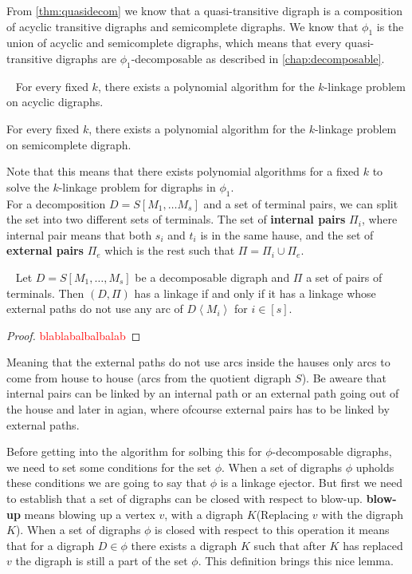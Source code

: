 From \autoref{thm:quasidecom} we know that a quasi-transitive digraph is a composition of acyclic transitive digraphs and semicomplete digraphs.
We know that $\phi_1$ is the union of acyclic and semicomplete digraphs, which means that every quasi-transitive digraphs are $\phi_1$-decomposable as described in \autoref{chap:decomposable}. 
\begin{thm}~\cite{bangJGT85}
    For every fixed $k$, there exists a polynomial algorithm for the $k$-linkage problem on acyclic digraphs.
\end{thm}
\begin{thm}
    For every fixed $k$, there exists a polynomial algorithm for the $k$-linkage problem on semicomplete digraph.
\end{thm}
Note that this means that there exists polynomial algorithms for a fixed $k$ to solve the $k$-linkage problem for digraphs in $\phi_1$.\\
For a decomposition $D=S[M_1,\dots M_s]$ and a set of terminal pairs, we can split the set into two different sets of terminals. 
The set of \textbf{internal pairs} $\Pi_i$, where internal pair means that both $s_i$ and $t_i$ is in the same hause, and the set of \textbf{external pairs} $\Pi_e$ which is the rest such that $\Pi=\Pi_i \cup \Pi_e$.\\
\begin{lemma}~\cite{bangJGT85}
    Let $D=S[M_1,\dots ,M_s]$ be a decomposable digraph and $\Pi$ a set of pairs of terminals. Then $(D,\Pi)$ has a linkage if and only if it has a linkage whose external paths do not use any arc of $D\left<M_i\right>$ for $i\in [s]$.
\end{lemma}
\begin{proof}
    \textcolor{red}{blablabalbalbalab}
\end{proof}
Meaning that the external paths do not use arcs inside the hauses only arcs to come from house to house (arcs from the quotient digraph $S$). Be aweare that internal pairs can be linked by an internal path or an external path going out of the house and later in agian, where ofcourse external pairs has to be linked by external paths. 

Before getting into the algorithm for solbing this for $\phi$-decomposable digraphs, we need to set some conditions for the set $\phi$. 
When a set of digraphs $\phi$ upholds these conditions we are going to say that $\phi$ is a linkage ejector. 
But first we need to establish that a set of digraphs can be closed with respect to blow-up.
\textbf{blow-up} means blowing up a vertex $v$, with a digraph $K$(Replacing $v$ with the digraph $K$).
When a set of digraphs $\phi$ is closed with respect to this operation it means that for a digraph $D\in \phi$ there exists a digraph $K$ such that after $K$ has replaced $v$ the digraph is still a part of the set $\phi$. 
This definition brings this nice lemma.

